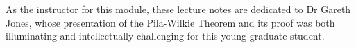 
%
%
%

\begin{dedication}
As the instructor for this module, these lecture notes are dedicated to Dr Gareth Jones, whose presentation of the Pila-Wilkie Theorem and its proof was both illuminating and intellectually challenging for this young graduate student.
\end{dedication}




